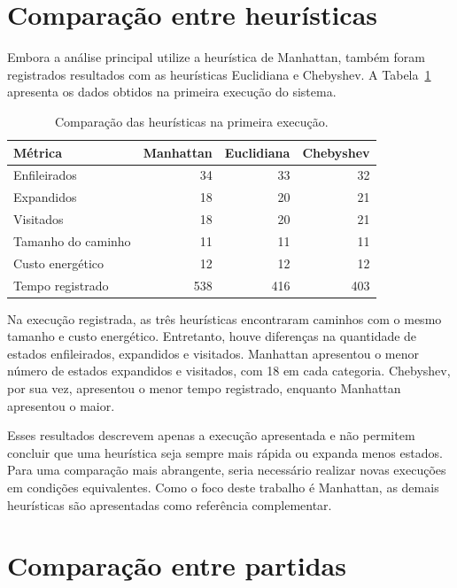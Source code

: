 \section{Comparação entre heurísticas}

Embora a análise principal utilize a heurística de Manhattan, também foram
registrados resultados com as heurísticas Euclidiana e Chebyshev. A
Tabela~\ref{tab:comparacao-heuristicas} apresenta os dados obtidos na primeira
execução do sistema.

\begin{table}[htbp]
	\centering
	\caption{Comparação das heurísticas na primeira execução.}
	\label{tab:comparacao-heuristicas}
	\small
	\begin{tabular}{|l|r|r|r|}
		\hline
		\textbf{Métrica} &
		\textbf{Manhattan} &
		\textbf{Euclidiana} &
		\textbf{Chebyshev} \\
		\hline
		Enfileirados       & 34  & 33  & 32  \\
		\hline
		Expandidos         & 18  & 20  & 21  \\
		\hline
		Visitados          & 18  & 20  & 21  \\
		\hline
		Tamanho do caminho & 11  & 11  & 11  \\
		\hline
		Custo energético   & 12  & 12  & 12  \\
		\hline
		Tempo registrado   & 538 & 416 & 403 \\
		\hline
	\end{tabular}
\end{table}

Na execução registrada, as três heurísticas encontraram caminhos com o mesmo
tamanho e custo energético. Entretanto, houve diferenças na quantidade de
estados enfileirados, expandidos e visitados. Manhattan apresentou o menor
número de estados expandidos e visitados, com 18 em cada categoria. Chebyshev,
por sua vez, apresentou o menor tempo registrado, enquanto Manhattan apresentou
o maior.

Esses resultados descrevem apenas a execução apresentada e não permitem concluir
que uma heurística seja sempre mais rápida ou expanda menos estados. Para uma
comparação mais abrangente, seria necessário realizar novas execuções em condições
equivalentes. Como o foco deste trabalho é Manhattan, as demais heurísticas são
apresentadas como referência complementar.

\section{Comparação entre partidas}


